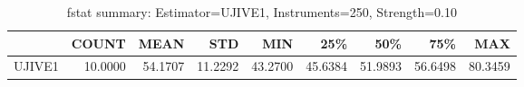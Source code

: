 \begin{table}[ht]
\centering
\caption{fstat summary: Estimator=UJIVE1, Instruments=250, Strength=0.10}
\begin{tabular}{lrrrrrrrr}
\toprule
 & COUNT & MEAN & STD & MIN & 25\% & 50\% & 75\% & MAX \\
\midrule
UJIVE1 & 10.0000 & 54.1707 & 11.2292 & 43.2700 & 45.6384 & 51.9893 & 56.6498 & 80.3459 \\
\bottomrule
\end{tabular}
\end{table}
